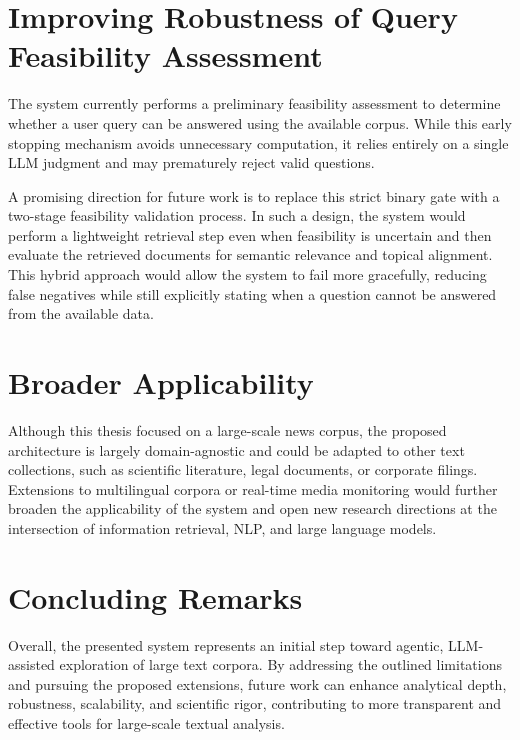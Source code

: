 \section{Improving Robustness of Query Feasibility Assessment}

The system currently performs a preliminary feasibility assessment to determine whether a user query can be answered using the available corpus. While this early stopping mechanism avoids unnecessary computation, it relies entirely on a single LLM judgment and may prematurely reject valid questions.

A promising direction for future work is to replace this strict binary gate with a two-stage feasibility validation process. In such a design, the system would perform a lightweight retrieval step even when feasibility is uncertain and then evaluate the retrieved documents for semantic relevance and topical alignment. This hybrid approach would allow the system to fail more gracefully, reducing false negatives while still explicitly stating when a question cannot be answered from the available data.

\section{Broader Applicability}

Although this thesis focused on a large-scale news corpus, the proposed architecture is largely domain-agnostic and could be adapted to other text collections, such as scientific literature, legal documents, or corporate filings. Extensions to multilingual corpora or real-time media monitoring would further broaden the applicability of the system and open new research directions at the intersection of information retrieval, NLP, and large language models.

\section{Concluding Remarks}

Overall, the presented system represents an initial step toward agentic, LLM-assisted exploration of large text corpora. By addressing the outlined limitations and pursuing the proposed extensions, future work can enhance analytical depth, robustness, scalability, and scientific rigor, contributing to more transparent and effective tools for large-scale textual analysis.